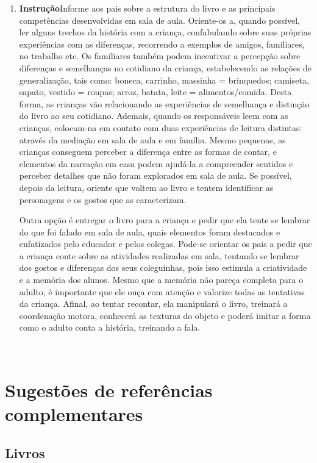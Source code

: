 \documentclass[11pt]{extarticle}
\begin{document}
\begin{enumerate}
\item \textbf{Instrução}\quad Informe aos pais sobre a estrutura do livro e as principais competências desenvolvidas em sala de aula.
Oriente-os a, quando possível, ler alguns trechos da história com a criança, confabulando sobre suas próprias experiências com as diferenças, recorrendo a exemplos de amigos, familiares, no trabalho etc.
Os familiares também podem incentivar a percepção sobre diferenças e semelhanças no cotidiano da criança, estabelecendo as relações de generalização, tais como: boneca, carrinho, massinha = brinquedos; camiseta, sapato, vestido = roupas; arroz, batata, leite = alimentos/comida.  
Desta forma, as crianças vão relacionando as experiências de semelhança e distinção do livro ao seu cotidiano.
Ademais, quando os responsáveis leem com as crianças, colocam-na em contato com duas experiências de leitura distintas: através da mediação em sala de aula e em família. 
Mesmo pequenas, as crianças conseguem perceber a diferença entre 
as formas de contar, e elementos da narração em casa podem ajudá-la a compreender 
sentidos e perceber detalhes que não foram explorados em sala de aula. Se possível, depois da leitura, oriente 
que voltem ao livro e tentem identificar as personagens e os gostos que as caracterizam.

Outra opção é entregar o livro para a criança e pedir que ela tente se lembrar
do que foi falado em sala de aula, quais elementos foram destacados e enfatizados pelo educador e pelos colegas. Pode-se orientar os pais a pedir que a criança conte sobre as atividades realizadas em sala, tentando se lembrar dos gostos e diferenças dos seus coleguinhas, pois isso estimula a criatividade e a memória dos alunos. Mesmo que a memória não pareça 
completa para o adulto, é importante que ele ouça com atenção e 
valorize todas as tentativas da criança. Afinal, ao tentar recontar, 
ela manipulará o livro, treinará a coordenação motora, conhecerá as texturas 
do objeto e poderá imitar a forma como o adulto 
conta a história, treinando a fala. 
\end{enumerate}

 
\section{Sugestões de referências complementares}

\subsection{Livros} 
\end{document}
